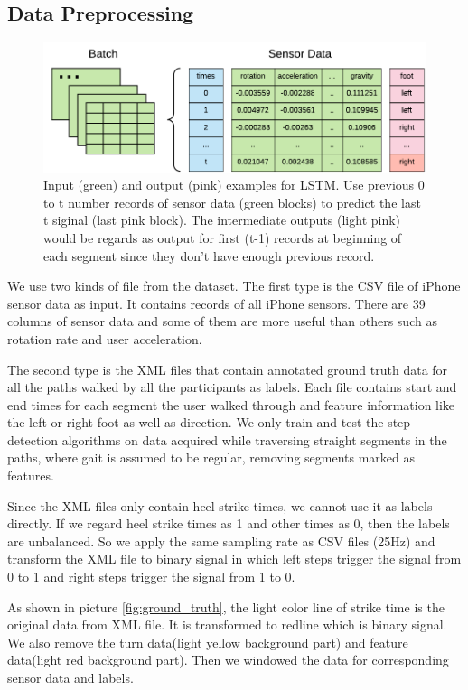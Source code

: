 \documentclass[11pt]{article}
\begin{document}
{\subsection{Data Preprocessing}

\begin{figure}[ht]
\centering
\includegraphics[scale=1]{input2}
\caption{Input (green) and output (pink) examples for LSTM. Use previous 0 to t number records of sensor data (green blocks) to predict the last t siginal (last pink block). The intermediate outputs (light pink) would be regards as output for first (t-1) records at beginning of each segment since they don't have enough previous record. }
\label{fig:batch_sensor_data}
\end{figure}

We use two kinds of file from the dataset. The first type is the CSV file of iPhone sensor data as input. It contains records of all iPhone sensors. There are 39 columns of sensor data and some of them are more useful than others such as rotation rate and user acceleration.

The second type is the XML files that contain annotated ground truth data for all the paths walked by all the participants as labels. Each file contains start and end times for each segment the user walked through and feature information like the left or right foot as well as direction. We only train and test the step detection algorithms on data acquired while traversing straight segments in the paths, where gait is assumed to be regular, removing segments marked as features. 

Since the XML files only contain heel strike times, we cannot use it as labels directly. If we regard heel strike times as 1 and other times as 0, then the labels are unbalanced. So we apply the same sampling rate as CSV files (25Hz) and transform the XML file to binary signal in which left steps trigger the signal from 0 to 1 and right steps trigger the signal from 1 to 0.

As shown in picture \ref{fig:ground_truth}, the light color line of strike time is the original data from XML file. It is transformed to redline which is binary signal. We also remove the turn data(light yellow background part) and feature data(light red background part). Then we windowed the data for corresponding sensor data and labels.


}
\end{document}
